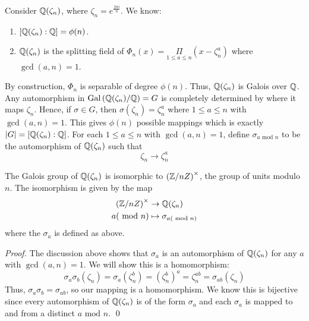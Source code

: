 Consider $\mathbb{Q}(\zeta_n)$, where $\zeta_n = e^\frac{2\pi i}{n}$. We know:
\begin{enumerate}
    \item $[\mathbb{Q}(\zeta_n):\mathbb{Q}] = \phi(n)$.
    \item $\mathbb{Q}(\zeta_n)$ is the splitting field of $\Phi_n(x) = \underset{1 \leq a \leq n}{\Pi} (x-\zeta_n^a)$ where $\gcd(a,n) = 1.$
\end{enumerate}

By construction, $\Phi_n$ is separable of degree $\phi(n)$. Thus, $\mathbb{Q}(\zeta_n)$ is Galois over $\mathbb{Q}$. Any automorphism in $\text{Gal}\left(\mathbb{Q}(\zeta_n) / \mathbb{Q}\right) = G$ is completely determined by where it maps $\zeta_n$. Hence, if $\sigma \in G$, then $\sigma(\zeta_n) = \zeta_n^a$ where $1 \leq a \leq n$ with $\gcd(a,n) = 1$. This gives $\phi(n)$ possible mappings which is exactly $|G| = [\mathbb{Q}(\zeta_n):\mathbb{Q}]$. For each $1 \leq a \leq n$ with $\gcd(a,n)=1$, define $\sigma_{a \text{ mod } n}$ to be the automorphism of $\mathbb{Q}(\zeta_n)$ such that 
\[\zeta_n \to \zeta_n^a\]

\begin{theorem}
    \label{thm5.26}
    The Galois group of $\mathbb{Q}(\zeta_n)$ is isomorphic to $\left(\mathbb{Z} /nZ\right)^\times$, the group of units modulo $n$. The isomorphism is given by the map
    \begin{align*}
        \left(\mathbb{Z}/nZ\right)^\times &\to \mathbb{Q}(\zeta_n) \\
        a (\text{ mod } n) &\mapsto \sigma_{a (\text{ mod } n)}
    \end{align*}
    where the $\sigma_a$ is defined as above.
\end{theorem}

\begin{proof}
    The discussion above shows that $\sigma_a$ is an automorphism of $\mathbb{Q}(\zeta_n)$ for any $a$ with $\gcd(a,n) = 1$. We will show this is a homomorphism:
    \[\sigma_a \sigma_b (\zeta_n) = \sigma_a(\zeta_n^b)= (\zeta_n^b)^a = \zeta_n^{ab} = \sigma_{ab}(\zeta_n)\]
    Thus, $\sigma_a \sigma_b = \sigma_{ab}$, so our mapping is a homomorphism. We know this is bijective since every automorphism of $\mathbb{Q}(\zeta_n)$ is of the form $\sigma_a$ and each $\sigma_a$ is mapped to and from a distinct $a \text{ mod } n$.
    \qed
\end{proof}

